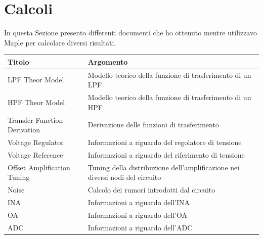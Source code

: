 \documentclass[a4paper, 10pt, final]{article} %
\begin{document}
    \section{Calcoli} \label{sec:Calculations}
    In questa Sezione presento differenti documenti che ho ottenuto mentre utilizzavo Maple per calcolare diversi risultati.
    \begin{center}
        \begin{tabular}{ ||l|l|| }
            \hline
            \multicolumn{1}{||l|}{Titolo} & \multicolumn{1}{|l||}{Argomento} \\
            \hline
            \hline
            LPF Theor Model & Modello teorico della funzione di trasferimento di un LPF \\
            HPF Theor Model & Modello teorico della funzione di trasferimento di un HPF \\
            Transfer Function Derivation & Derivazione delle funzioni di trasferimento \\
            Voltage Regulator & Informazioni a riguardo del regolatore di tensione \\
            Voltage Reference & Informazioni a riguardo del riferimento di tensione \\
            Offset Amplification Tuning & Tuning della distribuzione dell'amplificazione nei diversi nodi del circuito \\
            Noise & Calcolo dei rumori introdotti dal circuito \\
            INA & Informazioni a riguardo dell'INA \\
            OA & Informazioni a riguardo dell'OA \\
            ADC & Informazioni a riguardo dell'ADC \\
            \hline
        \end{tabular}
    \end{center}

    
    
    
    
    
    
    
    
    
    

    \printbibheading
    \printbibliography[keyword=major, heading=subbibliography, title={Sorgenti Maggiori}]
    \printbibliography[keyword=minor, heading=subbibliography, title={Sorgenti Minori}]
    \printbibliography[keyword=data, heading=subbibliography, title={Sorgenti Dati}]
    \printbibliography[keyword=image, heading=subbibliography, title={Sorgenti Immagini}]
    \printbibliography[keyword=datasheet, heading=subbibliography, title={Sorgenti Datasheet}]
    \printbibliography[keyword=software, heading=subbibliography, title={Sorgenti Software}]
    \printbibliography[keyword=web, heading=subbibliography, title={Sorgenti Componenti}]
\end{document}
